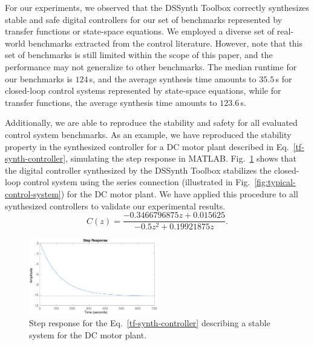 \documentclass[10pt,conference]{IEEEtran}
\newcommand\tool{{DSSynth Toolbox}\xspace}
\begin{document}

For our experiments, we observed that the \tool correctly synthesizes stable
and safe digital controllers for our set of benchmarks represented by
transfer functions or state-space equations.  We employed a diverse set of
real-world benchmarks extracted from the control literature.  However, note
that this set of benchmarks is still limited within the scope of this paper,
and the performance may not generalize to other benchmarks.  The median
runtime for our benchmarks is $124$\,s, and the average synthesis time
amounts to $35.5$\,s for closed-loop control systems represented by
state-space equations, while for transfer functions, the average synthesis
time amounts to $123.6$\,s.

Additionally, we are able to reproduce the stability and safety for all
evaluated control system benchmarks.  As an example, we have reproduced the
stability property in the synthesized controller for a DC motor plant
described in Eq.~\eqref{tf-synth-controller}, simulating the step response
in MATLAB.  Fig.~\ref{tf-step-response} shows that the digital controller
synthesized by the \tool stabilizes the closed-loop control system using the
series connection (illustrated in Fig.~\ref{fig:typical-control-system}) for
the DC motor plant.  We have applied this procedure to all synthesized
controllers to validate our experimental results.
%
\begin{equation}
\label{tf-synth-controller}
C(z)=\frac{-0.3466796875z+0.015625}{-0.5z^{2}+0.19921875z}.
\end{equation}

\begin{figure}[ht]
  \includegraphics[width=0.5\textwidth]{tf-step-response.eps}
  \caption{Step response for the Eq.~\eqref{tf-synth-controller} describing a stable system for the DC motor plant.}
  \label{tf-step-response}
\end{figure}
\end{document}
